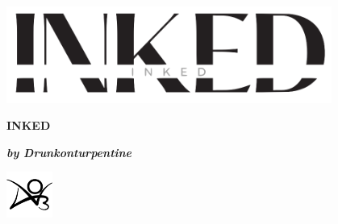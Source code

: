 \documentclass[12pt, a5paper, twoside]{book}
\begin{document}
\frontmatter

\mbox{}
\newpage

\mbox{}
\newpage

\mbox{}
\newpage

\mbox{}
\newpage

\begin{center}
    \centering
    \vspace*{5cm}
    \includegraphics[width=0.8\textwidth]{figures/title.png}    
    \vspace{2cm}
    \vspace{1cm}
\end{center}
\newpage

\mbox{}
\newpage



\begin{center}
    \vspace*{5cm}
    
    {\Huge\bf INKED}
    \vspace*{1mm}
    
    {\bf \it \large by Drunkonturpentine}

    \vspace*{\fill}
    \includegraphics[width=1.5cm]{figures/ao3.png}
\end{center}

\newpage
\end{document}
